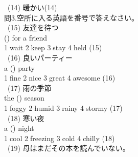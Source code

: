 \documentclass[uplatex]{jsarticle}
\begin{document}
\ (14) 暖かい\hspace{\fill}(14)\underline{\hspace{35mm}}\\
\Large 問3.空所に入る英語を番号で答えなさい。\\
\large\ (15) 友達を待つ\\
\hspace{10mm}(\hspace{10mm}) for a friend\\
\hspace{10mm}\textcircled{\normalsize1}wait \textcircled{\normalsize2}keep 
\textcircled{\normalsize3}stay \textcircled{\normalsize4}held 
\hspace{\fill}(15)\underline{\hspace{35mm}}\\
\ (16) 良いパーティー\\
\hspace{10mm}a (\hspace{10mm}) party\\
\hspace{10mm}\textcircled{\normalsize1}fine \textcircled{\normalsize2}nice 
\textcircled{\normalsize3}great \textcircled{\normalsize4}awesome 
\hspace{\fill}(16)\underline{\hspace{35mm}}\\
\ (17) 雨の季節\\
\hspace{10mm}the (\hspace{10mm}) season\\
\hspace{10mm}\textcircled{\normalsize1}foggy \textcircled{\normalsize2}humid 
\textcircled{\normalsize3}rainy \textcircled{\normalsize4}stormy 
\hspace{\fill}(17)\underline{\hspace{35mm}}\\
\ (18) 寒い夜\\
\hspace{10mm}a (\hspace{10mm}) night\\
\hspace{10mm}\textcircled{\normalsize1}cool \textcircled{\normalsize2}freezing 
\textcircled{\normalsize3}cold \textcircled{\normalsize4}chilly 
\hspace{\fill}(18)\underline{\hspace{35mm}}\\
\ (19) 母はまだその本を読んでいない。\\
\end{document}
